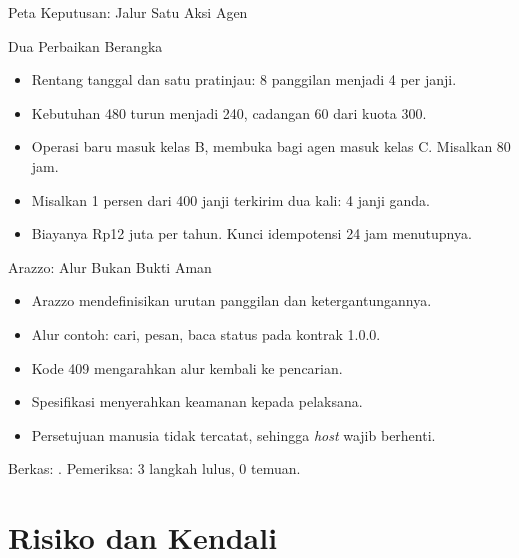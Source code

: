 \documentclass[aspectratio=169, table, 12pt]{beamer}
\begin{document}
\begin{frame}{{\Large Peta Keputusan: Jalur Satu Aksi Agen}}
  \centering
\end{frame}

\begin{frame}{{\Large Dua Perbaikan Berangka}}
  \vspace{8pt}
  \begin{itemize}
    \item Rentang tanggal dan satu pratinjau: 8 panggilan menjadi 4 per janji.
    \item Kebutuhan 480 turun menjadi 240, cadangan 60 dari kuota 300.
    \item Operasi baru masuk kelas B, membuka bagi agen masuk kelas C. Misalkan 80 jam.
    \item Misalkan 1 persen dari 400 janji terkirim dua kali: 4 janji ganda.
    \item Biayanya Rp12 juta per tahun. Kunci idempotensi 24 jam menutupnya.
  \end{itemize}
\end{frame}

\begin{frame}{{\Large Arazzo: Alur Bukan Bukti Aman}}
  \vspace{8pt}
  \begin{itemize}
    \item Arazzo mendefinisikan urutan panggilan dan ketergantungannya.
    \item Alur contoh: cari, pesan, baca status pada kontrak 1.0.0.
    \item Kode 409 mengarahkan alur kembali ke pencarian.
    \item Spesifikasi menyerahkan keamanan kepada pelaksana.
    \item Persetujuan manusia tidak tercatat, sehingga \textit{host} wajib berhenti.
  \end{itemize}
  \vspace{6pt}
  {\small Berkas: . Pemeriksa: 3 langkah lulus, 0 temuan.}
\end{frame}

\section{Risiko dan Kendali}
\end{document}
